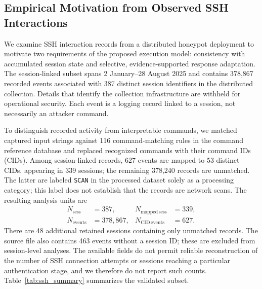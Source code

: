 \subsection{Empirical Motivation from Observed SSH Interactions}
\label{sec:empirical_motivation}

We examine SSH interaction records from a distributed honeypot deployment to
motivate two requirements of the proposed execution model: consistency with
accumulated session state and selective, evidence-supported response
adaptation. The session-linked subset spans 2 January--28 August 2025 and
contains 378,867 recorded events associated with 387 distinct session
identifiers in the distributed collection. Details that identify the
collection infrastructure are withheld for operational security.
Each event is a logging record linked to a session, not necessarily an
attacker command. 

To distinguish recorded activity from interpretable commands, we matched
captured input strings against 116 command-matching rules in the command
reference database and replaced recognized commands with their command IDs
(CIDs). Among session-linked records, 627 events are mapped to 53 distinct
CIDs, appearing in 339 sessions; the remaining 378,240 records are unmatched.
The latter are labeled \texttt{SCAN} in the processed dataset solely as a
processing category; this label does not establish that the records are
network scans. The resulting analysis units are
\begin{equation}
\begin{aligned}
N_{\mathrm{sess}} &= 387, &
N_{\mathrm{mapped\,sess}} &= 339,\\
N_{\mathrm{events}} &= 378{,}867, &
N_{\mathrm{CID\,events}} &= 627.
\end{aligned}
\label{eq:dataset_filtering}
\end{equation}
There are 48 additional retained sessions containing only unmatched
records. The source file also contains 463 events without a session ID;
these are excluded from session-level analyses. The available fields do
not permit reliable reconstruction of the number of SSH connection attempts
or sessions reaching a particular authentication stage, and we therefore
do not report such counts. Table~\ref{tab:ssh_summary} summarizes the
validated subset.

